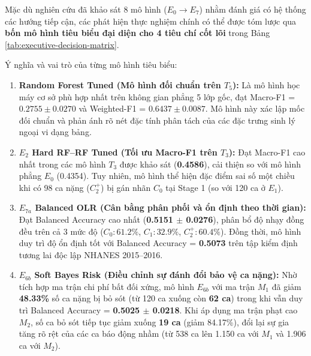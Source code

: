 Mặc dù nghiên cứu đã khảo sát 8 mô hình ($E_0 \to E_7$) nhằm đánh giá có hệ thống các hướng tiếp cận, các phát hiện thực nghiệm chính có thể được tóm lược qua \textbf{bốn mô hình tiêu biểu đại diện cho 4 tiêu chí cốt lõi} trong Bảng \ref{tab:executive-decision-matrix}.



Ý nghĩa và vai trò của từng mô hình tiêu biểu:
\begin{enumerate}
    \item \textbf{Random Forest Tuned (Mô hình đối chuẩn trên $T_5$):} Là mô hình học máy cơ sở phù hợp nhất trên không gian phẳng 5 lớp gốc, đạt Macro-F1 = $0.2755 \pm 0.0270$ và Weighted-F1 = $0.6437 \pm 0.0087$. Mô hình này xác lập mốc đối chuẩn và phản ánh rõ nét đặc tính phân tách của các đặc trưng sinh lý ngoại vi dạng bảng.
    \item \textbf{$E_2$ Hard RF--RF Tuned (Tối ưu Macro-F1 trên $T_3$):} Đạt Macro-F1 cao nhất trong các mô hình $T_3$ được khảo sát (\textbf{0.4586}), cải thiện so với mô hình phẳng $E_0$ (0.4354). Tuy nhiên, mô hình thể hiện đặc điểm sai số một chiều khi có 98 ca nặng ($C_2^+$) bị gán nhãn $C_0$ tại Stage 1 (so với 120 ca ở $E_1$).
    \item \textbf{$E_{7a}$ Balanced OLR (Cân bằng phân phối và ổn định theo thời gian):} Đạt Balanced Accuracy cao nhất (\textbf{0.5151 $\pm$ 0.0276}), phân bổ độ nhạy đồng đều trên cả 3 mức độ ($C_0: 61.2\%$, $C_1: 32.9\%$, $C_2^+: 60.4\%$). Đồng thời, mô hình duy trì độ ổn định tốt với Balanced Accuracy = \textbf{0.5073} trên tập kiểm định tương lai độc lập NHANES 2015--2016.
    \item \textbf{$E_{6b}$ Soft Bayes Risk (Điều chỉnh sự đánh đổi bảo vệ ca nặng):} Nhờ tích hợp ma trận chi phí bất đối xứng, mô hình $E_{6b}$ với ma trận $M_1$ đã giảm \textbf{48.33\%} số ca nặng bị bỏ sót (từ 120 ca xuống còn \textbf{62 ca}) trong khi vẫn duy trì Balanced Accuracy = \textbf{0.5025 $\pm$ 0.0218}. Khi áp dụng ma trận phạt cao $M_2$, số ca bỏ sót tiếp tục giảm xuống \textbf{19 ca} (giảm 84.17\%), đổi lại sự gia tăng rõ rệt của các ca báo động nhầm (từ 538 ca lên 1.150 ca với $M_1$ và 1.906 ca với $M_2$).
\end{enumerate}

